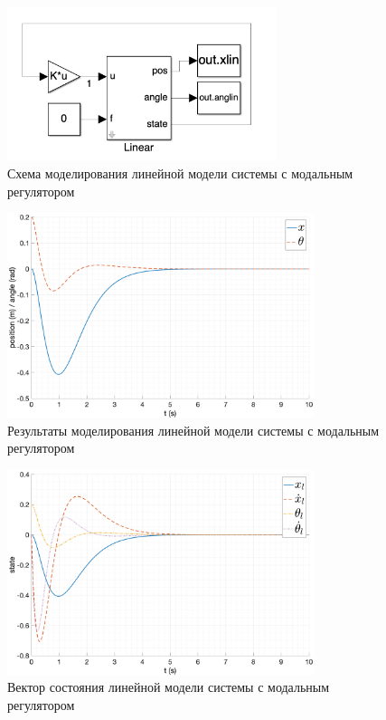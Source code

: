 \begin{figure}[ht!]
    \centering
    \includegraphics[width=0.7\textwidth]{media/modal_control_linear_scheme.png}
    \caption{Схема моделирования линейной модели системы с модальным регулятором}
    \label{fig:modal_control_scheme_linear}
\end{figure}

\begin{figure}[ht!]
    \centering
    \includegraphics[width=0.8\textwidth]{media/plots/modal_control/linear_out_0.png}
    \caption{Результаты моделирования линейной модели системы с модальным регулятором}
    \label{fig:modal_control_linear_out}
\end{figure}
\begin{figure}[ht!]
    \centering
    \includegraphics[width=0.8\textwidth]{media/plots/modal_control/state_lin_0.png}
    \caption{Вектор состояния линейной модели системы с модальным регулятором}
    \label{fig:modal_control_linear_state}
\end{figure}

